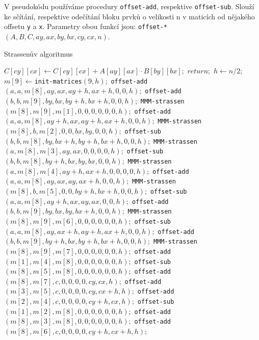 V pseudokódu používáme procedury \texttt{offset-add}, respektive \texttt{offset-sub}. Slouží ke sčítání, respektive odečítání bloku prvků o velikosti n v maticích od nějakého offsetu \texttt{y} a \texttt{x}. Parametry obou funkcí jsou: \texttt{offset-*}$(A,B,C,ay,ax,by,bx,cy,cx,n)$. 

\begin{algorithm}[H]
	\caption{Strassenův algoritmus}\label{mmm-strassen}
	\begin{algorithmic}[1]
			\State \texttt{$C[cy][cx]\gets C[cy][cx] + A[ay][ax] \cdot B[by][bx];$}
			\State \texttt{$return;$}
		\EndIf
  		\State \texttt{$h \gets n/2;$} 
  		\State \texttt{$m[9] \gets $init-matrices$(9, h);$} 
	\State \texttt{offset-add$(a, a, m[8], ay, ax, ay + h, ax + h, 0, 0, h);$} 
	\State \texttt{offset-add$(b, b, m[9], by, bx, by + h, bx + h, 0, 0, h);$}
	\State \texttt{MMM-strassen$(m[8], m[9], m[1], 0, 0, 0, 0, 0, 0, h);$}
%	
	\State \texttt{offset-add$(a, a, m[8], ay + h, ax, ay + h, ax + h, 0, 0, h);$} 
	\State \texttt{MMM-strassen$(m[8], b, m[2], 0, 0, bx, by, 0, 0, h);$}
%	
	\State \texttt{offset-sub$(b, b, m[8], by, bx + h, by + h, bx + h, 0, 0, h);$} 
	\State \texttt{MMM-strassen$(a, m[8], m[3], ay, ax, 0, 0, 0, 0, h);$}
%	
	\State \texttt{offset-sub$(b, b, m[8], by + h, bx, by, bx, 0, 0, h);$} 
	\State \texttt{MMM-strassen$(a, m[8], m[4], ay + h, ax + h, 0, 0, 0, 0, h);$}
%	
	\State \texttt{offset-add$(a, a, m[8], ay, ax, ay, ax + h, 0, 0, h);$} 
	\State \texttt{MMM-strassen$(m[8], b, m[5], 0, 0, by + h, bx + h, 0, 0, h);$}
%	
	\State \texttt{offset-sub$(a, a, m[8], ay + h, ax, ay, ax, 0, 0, h);$} 
	\State \texttt{offset-add$(b, b, m[9], by, bx, by, bx + h, 0, 0, h);$}
	\State \texttt{MMM-strassen$(m[8], m[9], m[6], 0, 0, 0, 0, 0, 0, h);$}
%	
	\State \texttt{offset-sub$(a, a, m[8], ay, ax + h, ay + h, ax + h, 0, 0, h);$} 
	\State \texttt{offset-add$(b, b, m[9], by + h, bx, by + h, bx + h, 0, 0, h);$}
	\State \texttt{MMM-strassen$(m[8], m[9], m[7], 0, 0, 0, 0, 0, 0, h);$}
%	
	\State \texttt{offset-add$(m[1], m[4], m[8], 0, 0, 0, 0, 0, 0, h);$} 
	\State \texttt{offset-sub$(m[8], m[5], m[8], 0, 0, 0, 0, 0, 0, h);$}
	\State \texttt{offset-add$(m[8], m[7], c, 0, 0, 0, 0, cy, cx, h);$}
%	
	\State \texttt{offset-add$(m[3], m[5], c, 0, 0, 0, 0, cy, cx + h, h);$} 
%	
	\State \texttt{offset-add$(m[2], m[4], c, 0, 0, 0, 0, cy + h, cx, h);$} 
%	
	\State \texttt{offset-sub$(m[1], m[2], m[8], 0, 0, 0, 0, 0, 0, h);$} 
	\State \texttt{offset-add$(m[8], m[3], m[8], 0, 0, 0, 0, 0, 0, h);$}
	\State \texttt{offset-add$(m[8], m[6], c, 0, 0, 0, 0, cy + h, cx + h, h);$}		
		\EndProcedure
	\end{algorithmic}
\end{algorithm}

